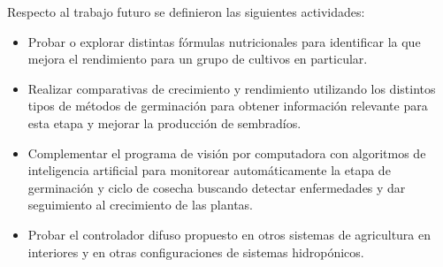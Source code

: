 Respecto al trabajo futuro se definieron las siguientes actividades: 
\begin{itemize}
    \item Probar o explorar distintas fórmulas nutricionales para identificar la que mejora el rendimiento para un grupo de cultivos en particular.
    \item Realizar comparativas de crecimiento y rendimiento utilizando los distintos tipos de métodos de germinación para obtener información relevante para esta etapa y mejorar la producción de sembradíos.
    \item Complementar el programa de visión por computadora con algoritmos de inteligencia artificial para monitorear automáticamente la etapa de germinación y ciclo de cosecha buscando detectar enfermedades y dar seguimiento al crecimiento de las plantas.
    \item Probar el controlador difuso propuesto en otros sistemas de agricultura en interiores y en otras configuraciones de sistemas hidropónicos.
\end{itemize}
